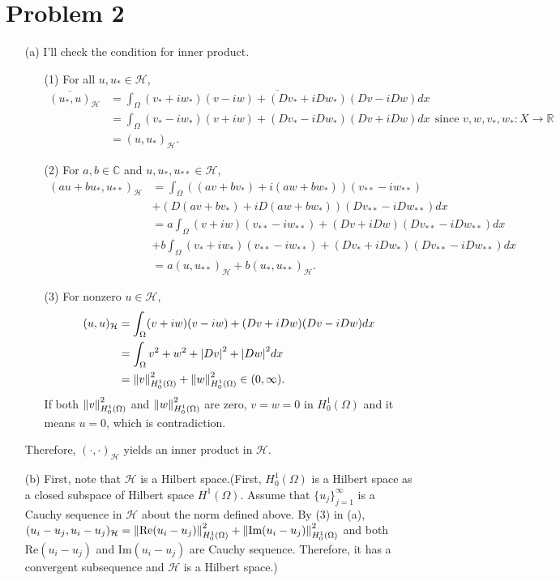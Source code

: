 \documentclass{article}
\begin{document}
\section*{Problem 2}
\begin{enumerate}
\item[(a)] I'll check the condition for inner product.
\begin{enumerate}
\item[(1)] For all $u,u_*\in \mathcal{H}$,
\begin{equation*}
\begin{split}
\overline{(u_*,u)}_{\mathcal{H}}&=\overline{\int_\Omega (v_*+iw_*)(v-iw)+(Dv_*+iDw_*)(Dv-iDw)dx} \\
&=\int_\Omega (v_*-iw_*)(v+iw)+(Dv_*-iDw_*)(Dv+iDw)dx~~\text{since }v,w,v_*,w_*:X\rightarrow \mathbb{R} \\
&=(u, u_*)_{\mathcal{H}}.
\end{split}
\end{equation*}
\item[(2)] For $a,b\in \mathbb{C}$ and $u,u_*,u_{**}\in \mathcal{H}$,
\begin{equation*}
\begin{split}
(au+bu_*,u_{**})_{\mathcal{H}}&=\int_\Omega ((av+bv_*)+i(aw+bw_*))(v_{**}-iw_{**})\\
&+(D(av+bv_*)+iD(aw+bw_*))(Dv_{**}-iDw_{**})dx \\
&=a\int_\Omega (v+iw)(v_{**}-iw_{**})+(Dv+iDw)(Dv_{**}-iDw_{**})dx\\
&+b\int_\Omega (v_*+iw_*)(v_{**}-iw_{**})+(Dv_*+iDw_*)(Dv_{**}-iDw_{**})dx \\
&=a(u, u_{**})_{\mathcal{H}}+b(u_*, u_{**})_{\mathcal{H}}.
\end{split}
\end{equation*}
\item[(3)] For nonzero $u\in \mathcal{H}$,
\begin{equation*}
\begin{split}
(u,u)_{\mathcal{H}}&=\int_\Omega (v+iw)(v-iw)+(Dv+iDw)(Dv-iDw)dx \\
&=\int_\Omega v^2+w^2+\abs{Dv}^2+\abs{Dw}^2dx \\
&=\norm{v}^2_{H^1_0(\Omega)}+\norm{w}^2_{H^1_0(\Omega)}\in (0,\infty).
\end{split}
\end{equation*}
If both $\norm{v}^2_{H^1_0(\Omega)}$ and $\norm{w}^2_{H^1_0(\Omega)}$ are zero, $v=w=0$ in $H^1_0(\Omega)$ and it means $u=0$, which is contradiction.
\end{enumerate}
Therefore, $(\cdot,\cdot)_{\mathcal{H}}$ yields an inner product in $\mathcal{H}$.
\item[(b)] First, note that $\mathcal{H}$ is a Hilbert space.(First, $H^1_0(\Omega)$ is a Hilbert space as a closed subspace of Hilbert space $H^1(\Omega)$. Assume that $\{u_j\}_{j=1}^\infty$ is a Cauchy sequence in $\mathcal{H}$ about the norm defined above. By (3) in (a), $(u_i-u_j,u_i-u_j)_{\mathcal{H}}=\norm{\text{Re}(u_i-u_j)}^2_{H^1_0(\Omega)}+\norm{\text{Im}(u_i-u_j)}^2_{H^1_0(\Omega)}$ and both $\text{Re}(u_i-u_j)$ and $\text{Im}(u_i-u_j)$ are Cauchy sequence. Therefore, it has a convergent subsequence and $\mathcal{H}$ is a Hilbert space.)


\end{enumerate}
\end{document}
